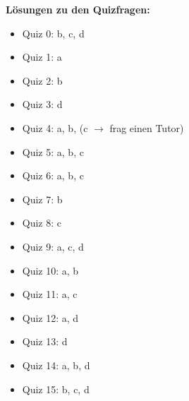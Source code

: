 \textbf{Lösungen  zu den Quizfragen:}
\begin{itemize}
	\item Quiz 0: b, c, d
	\item Quiz 1: a
	\item Quiz 2: b
	\item Quiz 3: d
	\item Quiz 4: a, b, (c $\rightarrow$ frag einen Tutor)
	\item Quiz 5: a, b, c
	\item Quiz 6: a, b, c
	\item Quiz 7: b
	\item Quiz 8: c
	\item Quiz 9: a, c, d
	\item Quiz 10: a, b
	\item Quiz 11: a, c
	\item Quiz 12: a, d
	\item Quiz 13: d
	\item Quiz 14: a, b, d
	\item Quiz 15: b, c, d
\end{itemize}